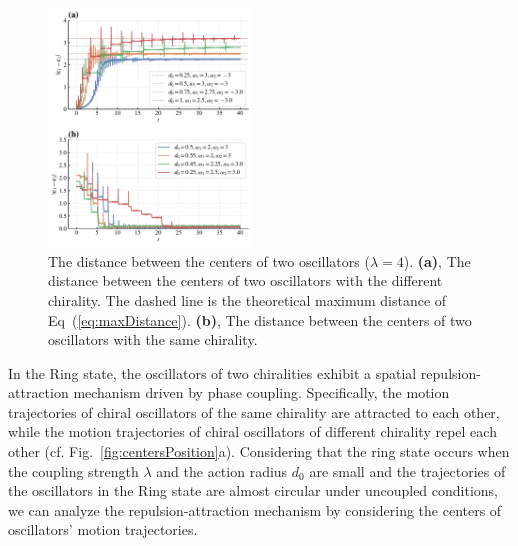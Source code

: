 \documentclass[%
 aip,
 amsmath,amssymb,
 reprint,%
]{revtex4-1}
\begin{document}
\begin{figure}[b]
    \includegraphics[width=0.48\textwidth]{./figs/2OsCenterDistance.pdf}
    \caption{
        \label{fig:2OsCenterDistance} The distance between the centers of two oscillators ($\lambda=4$). 
        \textbf{(a)}, The distance between the centers of two oscillators with the different chirality. The dashed line is the theoretical maximum distance of Eq~(\ref{eq:maxDistance}).
        \textbf{(b)}, The distance between the centers of two oscillators with the same chirality.
    }
\end{figure}

In the Ring state, the oscillators of two chiralities exhibit a spatial repulsion-attraction mechanism driven by phase coupling. Specifically, the motion trajectories of chiral oscillators of the same chirality are attracted to each other, while the motion trajectories of chiral oscillators of different chirality repel each other (cf. Fig.~\ref{fig:centersPosition}a). Considering that the ring state occurs when the coupling strength $\lambda$ and the action radius $d_0$ are small and the trajectories of the oscillators in the Ring state are almost circular under uncoupled conditions, we can analyze the repulsion-attraction mechanism by considering the centers of oscillators' motion trajectories.
\end{document}

